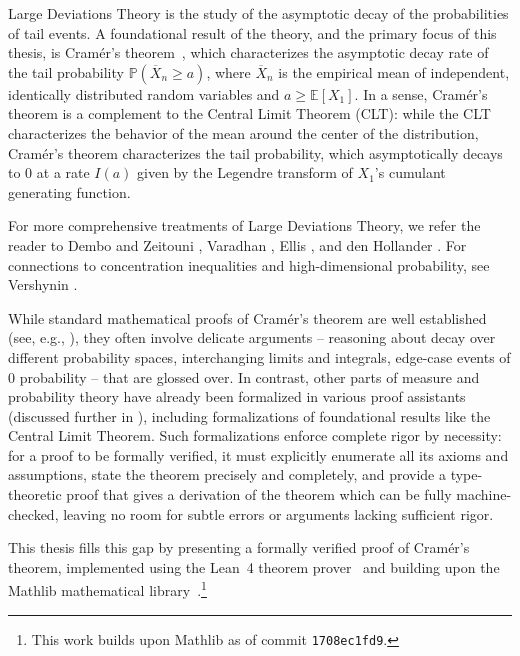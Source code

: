 \documentclass{article}
\newcommand{\E}{\mathbb{E}}
\renewcommand{\P}{\mathbb{P}}
\begin{document}
Large Deviations Theory is the study of the asymptotic decay of the probabilities of tail events.
A foundational result of the theory, and the primary focus of this thesis, is Cram{\'e}r's theorem~\cite{cramer1938sur}, which characterizes the asymptotic decay rate of the tail probability $\P(\overline{X}_n \ge a)$, where $\overline{X}_n$ is the empirical mean of independent, identically distributed random variables and $a \ge \E[X_1]$. In a sense, Cram{\'e}r's theorem is a complement to the
Central Limit Theorem (CLT): while the CLT characterizes the behavior of the mean around the center
of the distribution, Cram{\'e}r's theorem characterizes the tail probability, which asymptotically decays to 0
at a rate $I(a)$ given by the Legendre transform of $X_1$'s
cumulant generating function.

For more comprehensive treatments of Large Deviations Theory, we refer the reader to Dembo and Zeitouni \cite{dembo1998large}, Varadhan \cite{varadhan1984}, Ellis \cite{ellis1985}, and den Hollander \cite{denhollander2000}. For connections to concentration inequalities and high-dimensional probability, see Vershynin \cite{vershynin2026}.

While standard mathematical proofs of Cram{\'e}r's theorem are well established
(see, e.g., \cite{dembo1998large, denhollander2000}), they often involve delicate arguments
-- reasoning about decay over different probability spaces, interchanging limits and integrals,
edge-case events of 0 probability -- that are glossed over.
In contrast, other parts of measure and probability theory have already been formalized in
various proof assistants (discussed further in ), including
formalizations of foundational results like the Central Limit Theorem. Such formalizations enforce complete rigor
by necessity: for a proof to be formally verified, it must explicitly enumerate all its axioms and
assumptions, state the theorem precisely and completely, and provide a type-theoretic proof that
gives a derivation of the theorem which can be fully machine-checked, leaving no room for subtle
errors or arguments lacking sufficient rigor.

This thesis fills this gap by presenting a formally verified proof of Cram{\'e}r's theorem,
implemented using the Lean~4 theorem prover~\cite{demoura2021lean4} and building upon the Mathlib
mathematical library~\cite{mathlib2020}.\footnote{This work builds upon Mathlib as of commit \texttt{1708ec1fd9}.}
\end{document}
